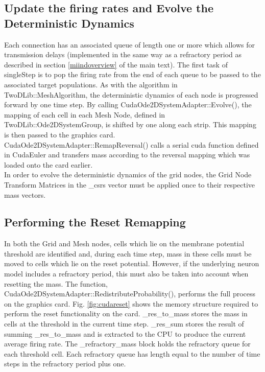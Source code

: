 \documentclass[utf8]{frontiers_suppmat} %
\begin{document}
\subsection{Update the firing rates and Evolve the Deterministic Dynamics}

Each connection has an associated queue of length one or more which allows for transmission delays (implemented in the same way as a refractory period as described in section \ref{miindoverview} of the main text). The first task of singleStep is to pop the firing rate from the end of each queue to be passed to the associated target populations. As with the algorithm in TwoDLib::MeshAlgorithm, the deterministic dynamics of each node is progressed forward by one time step. By calling CudaOde2DSystemAdapter::Evolve(), the mapping of each cell in each Mesh Node, defined in TwoDLib::Ode2DSystemGroup, is shifted by one along each strip. This mapping is then passed to the graphics card. CudaOde2DSystemAdapter::RemapReversal() calls a serial cuda function defined in CudaEuler and transfers mass according to the reversal mapping which was loaded onto the card earlier. \\
In order to evolve the deterministic dynamics of the grid nodes, the Grid Node Transform Matrices in the \_csrs vector must be applied once to their respective mass vectors. \\

\subsection{Performing the Reset Remapping}

In both the Grid and Mesh nodes, cells which lie on the membrane potential threshold are identified and, during each time step, mass in these cells must be moved to cells which lie on the reset potential. However, if the underlying neuron model includes a refractory period, this must also be taken into account when resetting the mass. The function, CudaOde2DSystemAdapter::RedistributeProbability(), performs the full process on the graphics card. Fig. \ref{fig:cudareset} shows the memory structure required to perform the reset functionality on the card. \_res\_to\_mass stores the mass in cells at the threshold in the current time step. \_res\_sum stores the result of summing \_res\_to\_mass and is extracted to the CPU to produce the current average firing rate. The \_refractory\_mass block holds the refractory queue for each threshold cell. Each refractory queue has length equal to the number of time steps in the refractory period plus one. 
\end{document}
